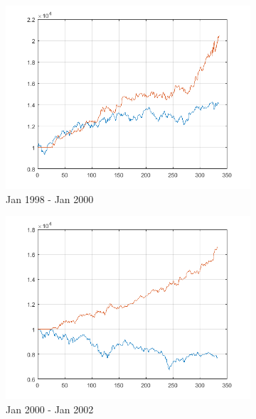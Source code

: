 \documentclass[11pt,a4,twosided,singlespacing,titlepagenumber=on]{scrreprt}
\numberwithin{equation}{chapter} %
\theoremstyle{remark}
\begin{document}
\begin{figure}[H]
\begin{subfigure}[t]{0.32\textwidth}
        \includegraphics[width=1\textwidth]{res/backtest/5}
        \caption{Jan 1998 - Jan 2000}
    \end{subfigure}
    \begin{subfigure}[t]{0.32\textwidth}
        \centering
        \includegraphics[width=1\textwidth]{res/backtest_cpx/6}
        \caption{Jan 2000 - Jan 2002}
    \end{subfigure}
    \begin{subfigure}[t]{0.32\textwidth}
        \centering

\end{subfigure}
\end{figure}
\end{document}
